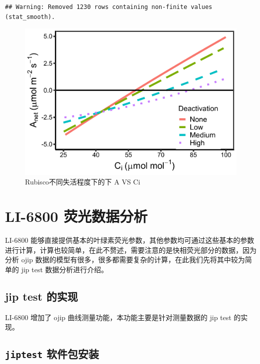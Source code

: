 \documentclass[
]{krantz}
\begin{document}
\begin{verbatim}
## Warning: Removed 1230 rows containing non-finite values (stat_smooth).
\end{verbatim}

\begin{figure}
\centering
\includegraphics{bookdown_files/figure-latex/deasratetplot-1.pdf}
\caption{\label{fig:deasratetplot}Rubisco不同失活程度下的下 A VS Ci}
\end{figure}

\cleardoublepage

\hypertarget{fluro68}{%
\section{LI-6800 荧光数据分析}\label{fluro68}}

LI-6800 能够直接提供基本的叶绿素荧光参数，其他参数均可通过这些基本的参数进行计算，计算也较简单，在此不赘述，需要注意的是快相荧光部分的数据，因为分析 ojip 数据的模型有很多，很多都需要复杂的计算，在此我们先将其中较为简单的 jip test 数据分析进行介绍。

\hypertarget{jiptest}{%
\subsection{jip test 的实现}\label{jiptest}}

LI-6800 增加了 ojip 曲线测量功能，本功能主要是针对测量数据的 jip test 的实现。

\hypertarget{jiptest_pack}{%
\subsection{\texorpdfstring{\texttt{jiptest} 软件包安装}{jiptest 软件包安装}}\label{jiptest_pack}}
\end{document}
